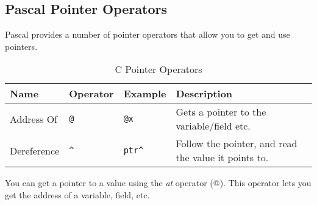 \clearpage

\subsection{Pascal Pointer Operators} %
\label{sub:pas_pointer_operators}

Pascal provides a number of pointer operators that allow you to get and use pointers.

\begin{table}[h]
  \centering
  \begin{tabular}{|l|l|l|p{8cm}|}
    \hline
    \textbf{Name} & \textbf{Operator}  & \textbf{Example}  & \textbf{Description} \\
    \hline
    Address Of & \texttt{@} & \texttt{@x} & Gets a pointer to the variable/field etc. \\
    \hline
    Dereference & \texttt{\^} & \texttt{ptr\^} & Follow the pointer, and read the value it points to.\\
    \hline
  \end{tabular}
  \caption{C Pointer Operators}
  \label{tbl:pas-ptr-operators}
\end{table}

You can get a pointer to a value using the \emph{at} operator (@). This operator lets you get the address of a variable, field, etc.



